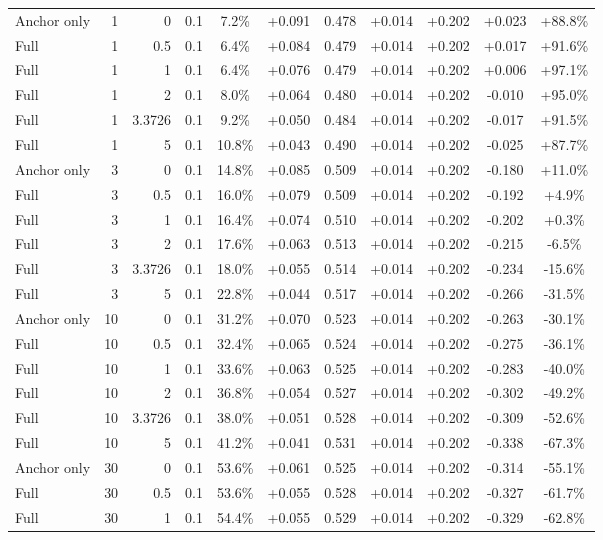 \begin{table}[htbp]
\begin{tabular}{lrrrccccccc}
Anchor only & 1 & 0 & 0.1 & 7.2\% & +0.091 & 0.478 & +0.014 & +0.202 & +0.023 & +88.8\% \\
Full & 1 & 0.5 & 0.1 & 6.4\% & +0.084 & 0.479 & +0.014 & +0.202 & +0.017 & +91.6\% \\
Full & 1 & 1 & 0.1 & 6.4\% & +0.076 & 0.479 & +0.014 & +0.202 & +0.006 & +97.1\% \\
Full & 1 & 2 & 0.1 & 8.0\% & +0.064 & 0.480 & +0.014 & +0.202 & -0.010 & +95.0\% \\
Full & 1 & 3.3726 & 0.1 & 9.2\% & +0.050 & 0.484 & +0.014 & +0.202 & -0.017 & +91.5\% \\
Full & 1 & 5 & 0.1 & 10.8\% & +0.043 & 0.490 & +0.014 & +0.202 & -0.025 & +87.7\% \\
Anchor only & 3 & 0 & 0.1 & 14.8\% & +0.085 & 0.509 & +0.014 & +0.202 & -0.180 & +11.0\% \\
Full & 3 & 0.5 & 0.1 & 16.0\% & +0.079 & 0.509 & +0.014 & +0.202 & -0.192 & +4.9\% \\
Full & 3 & 1 & 0.1 & 16.4\% & +0.074 & 0.510 & +0.014 & +0.202 & -0.202 & +0.3\% \\
Full & 3 & 2 & 0.1 & 17.6\% & +0.063 & 0.513 & +0.014 & +0.202 & -0.215 & -6.5\% \\
Full & 3 & 3.3726 & 0.1 & 18.0\% & +0.055 & 0.514 & +0.014 & +0.202 & -0.234 & -15.6\% \\
Full & 3 & 5 & 0.1 & 22.8\% & +0.044 & 0.517 & +0.014 & +0.202 & -0.266 & -31.5\% \\
Anchor only & 10 & 0 & 0.1 & 31.2\% & +0.070 & 0.523 & +0.014 & +0.202 & -0.263 & -30.1\% \\
Full & 10 & 0.5 & 0.1 & 32.4\% & +0.065 & 0.524 & +0.014 & +0.202 & -0.275 & -36.1\% \\
Full & 10 & 1 & 0.1 & 33.6\% & +0.063 & 0.525 & +0.014 & +0.202 & -0.283 & -40.0\% \\
Full & 10 & 2 & 0.1 & 36.8\% & +0.054 & 0.527 & +0.014 & +0.202 & -0.302 & -49.2\% \\
Full & 10 & 3.3726 & 0.1 & 38.0\% & +0.051 & 0.528 & +0.014 & +0.202 & -0.309 & -52.6\% \\
Full & 10 & 5 & 0.1 & 41.2\% & +0.041 & 0.531 & +0.014 & +0.202 & -0.338 & -67.3\% \\
Anchor only & 30 & 0 & 0.1 & 53.6\% & +0.061 & 0.525 & +0.014 & +0.202 & -0.314 & -55.1\% \\
Full & 30 & 0.5 & 0.1 & 53.6\% & +0.055 & 0.528 & +0.014 & +0.202 & -0.327 & -61.7\% \\
Full & 30 & 1 & 0.1 & 54.4\% & +0.055 & 0.529 & +0.014 & +0.202 & -0.329 & -62.8\% \\

\end{tabular}
\end{table}
